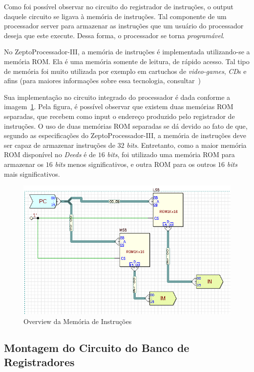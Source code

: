 \documentclass[12pt]{article}
\begin{document}
Como foi possível observar no circuito do registrador de instruções, o output
daquele circuito se ligava à memória de instruções. Tal componente de um
processador server para armazenar as instruções que um usuário do processador
deseja que este execute. Dessa forma, o processador se torna \emph{programável}.

No ZeptoProcessador-III, a memória de instruções é implementada utilizando-se a
memória ROM. Ela é uma memória somente de leitura, de rápido acesso. Tal tipo de
memória foi muito utilizada por exemplo em cartuchos de \emph{video-games},
\emph{CD}s e afins (para maiores informações sobre essa tecnologia,
consultar~\cite{ROM_memory})

Sua implementação no circuito integrado do processador é dada conforme a
imagem~\ref{fig:circuit__ROM_memory.png}. Pela figura, é possível observar que
existem duas memórias ROM separadas, que recebem como input o endereço produzido
pelo registrador de instruções. O uso de duas memórias ROM separadas se dá
devido ao fato de que, segundo as especificações do ZeptoProcessador-III, a
memória de instruções deve ser capaz de armazenar instruções de $32$
\emph{bits}. Entretanto, como a maior memória ROM disponível no \emph{Deeds} é
de $16$ \emph{bits}, foi utilizado uma memória ROM para armazenar os $16$
\emph{bits} menos significativos, e outra ROM para os outros $16$ \emph{bits}
mais significativos.

\begin{figure}[H]
    \centering
    \includegraphics[width=.9\textwidth]{Projeto/images/circuit__ROM_memory.png}
    \caption{Overview da Memória de Instruções}\label{fig:circuit__ROM_memory.png}
\end{figure}

\subsection{Montagem do Circuito do Banco de Registradores}\label{sec:2.3}
\end{document}
